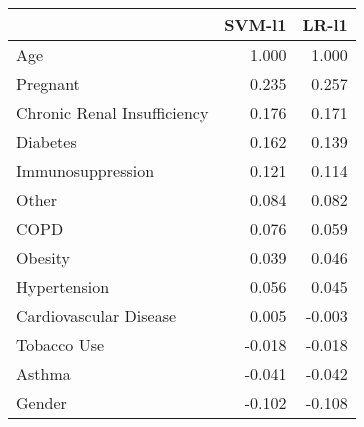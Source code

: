 \begin{tabular}{lrr}
\toprule
{} &  SVM-l1 &  LR-l1 \\
\midrule
Age                         &   1.000 &  1.000 \\
Pregnant                    &   0.235 &  0.257 \\
Chronic Renal Insufficiency &   0.176 &  0.171 \\
Diabetes                    &   0.162 &  0.139 \\
Immunosuppression           &   0.121 &  0.114 \\
Other                       &   0.084 &  0.082 \\
COPD                        &   0.076 &  0.059 \\
Obesity                     &   0.039 &  0.046 \\
Hypertension                &   0.056 &  0.045 \\
Cardiovascular Disease      &   0.005 & -0.003 \\
Tobacco Use                 &  -0.018 & -0.018 \\
Asthma                      &  -0.041 & -0.042 \\
Gender                      &  -0.102 & -0.108 \\
\bottomrule
\end{tabular}
